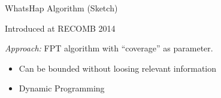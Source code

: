\documentclass[notes=hide]{beamer}
\begin{document}
\begin{frame}{WhatsHap Algorithm (Sketch)}
		\begin{block}{}
			Introduced at RECOMB 2014
		\end{block}
\begin{block}{}
\emph{Approach:} FPT algorithm with ``coverage'' as parameter.
\begin{itemize}
 \item Can be bounded without loosing relevant information
 \item Dynamic Programming
\end{itemize}
\end{block}
\end{frame}

\end{document}
